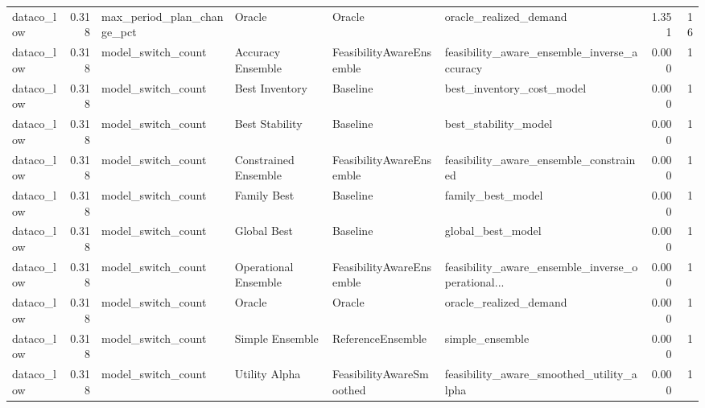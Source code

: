 \begin{table}
{\begin{tabular}{lrllllrr}
    dataco\_low &             0.318 &  max\_period\_plan\_change\_pct &                Oracle &                    Oracle &                             oracle\_realized\_demand &         1.351 &              16 \\
    dataco\_low &             0.318 &          model\_switch\_count &     Accuracy Ensemble &  FeasibilityAwareEnsemble &        feasibility\_aware\_ensemble\_inverse\_accuracy &         0.000 &               1 \\
    dataco\_low &             0.318 &          model\_switch\_count &        Best Inventory &                  Baseline &                          best\_inventory\_cost\_model &         0.000 &               1 \\
    dataco\_low &             0.318 &          model\_switch\_count &        Best Stability &                  Baseline &                               best\_stability\_model &         0.000 &               1 \\
    dataco\_low &             0.318 &          model\_switch\_count &  Constrained Ensemble &  FeasibilityAwareEnsemble &             feasibility\_aware\_ensemble\_constrained &         0.000 &               1 \\
    dataco\_low &             0.318 &          model\_switch\_count &           Family Best &                  Baseline &                                  family\_best\_model &         0.000 &               1 \\
    dataco\_low &             0.318 &          model\_switch\_count &           Global Best &                  Baseline &                                  global\_best\_model &         0.000 &               1 \\
    dataco\_low &             0.318 &          model\_switch\_count &  Operational Ensemble &  FeasibilityAwareEnsemble &  feasibility\_aware\_ensemble\_inverse\_operational... &         0.000 &               1 \\
    dataco\_low &             0.318 &          model\_switch\_count &                Oracle &                    Oracle &                             oracle\_realized\_demand &         0.000 &               1 \\
    dataco\_low &             0.318 &          model\_switch\_count &       Simple Ensemble &         ReferenceEnsemble &                                    simple\_ensemble &         0.000 &               1 \\
    dataco\_low &             0.318 &          model\_switch\_count &         Utility Alpha &  FeasibilityAwareSmoothed &           feasibility\_aware\_smoothed\_utility\_alpha &         0.000 &               1 \\

\end{tabular}}
\end{table}
